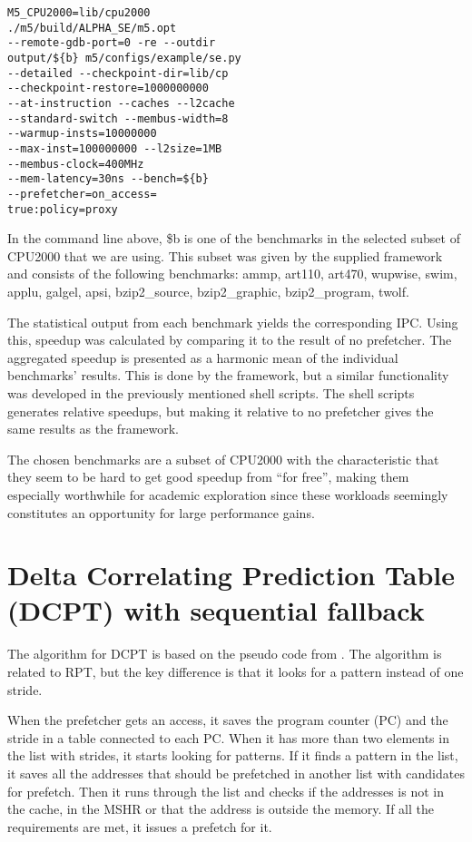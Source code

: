 \documentclass[12pt,journal,compsoc]{IEEEtran}
\begin{document}
\begin{verbatim}
M5_CPU2000=lib/cpu2000
./m5/build/ALPHA_SE/m5.opt
--remote-gdb-port=0 -re --outdir
output/${b} m5/configs/example/se.py
--detailed --checkpoint-dir=lib/cp
--checkpoint-restore=1000000000
--at-instruction --caches --l2cache
--standard-switch --membus-width=8
--warmup-insts=10000000
--max-inst=100000000 --l2size=1MB
--membus-clock=400MHz
--mem-latency=30ns --bench=${b}
--prefetcher=on_access=
true:policy=proxy
\end{verbatim}

In the command line above, \${b} is one of the benchmarks in the selected
subset of CPU2000 that we are using. This subset was given by the supplied
framework and consists of the following benchmarks: ammp, art110, art470,
wupwise, swim, applu, galgel, apsi, bzip2\_source, bzip2\_graphic,
bzip2\_program, twolf.

The statistical output from each benchmark yields the corresponding
IPC. Using this, speedup was calculated by comparing it to the result
of no prefetcher. The aggregated speedup is presented as a harmonic mean of
the individual benchmarks' results. This is done by the framework, but a
similar functionality was developed in the previously mentioned shell scripts.
The shell scripts generates relative speedups, but making it relative to no
prefetcher gives the same results as the framework.

The chosen benchmarks are a subset of CPU2000 with the characteristic that
they seem to be hard to get good speedup from ``for free'', making
them especially worthwhile for academic exploration since these workloads
seemingly constitutes an opportunity for large performance gains.

\section{Delta Correlating Prediction Table (DCPT) with sequential fallback}
The algorithm for DCPT is based on the pseudo code from \cite{dcptpaper}.
The algorithm is related to RPT, but the key difference is that it looks for a pattern instead of one stride.

When the prefetcher gets an access, it saves the program counter (PC) and the stride in a table connected to each PC. When it has more than two elements in the list with strides, it starts looking for patterns.
If it finds a pattern in the list, it saves all the addresses that should be prefetched in another list with candidates for prefetch.
Then it runs through the list and checks if the addresses is not in the cache, in the MSHR or that the address is outside the memory. If all the requirements are met, it issues a prefetch for it.
\end{document}
